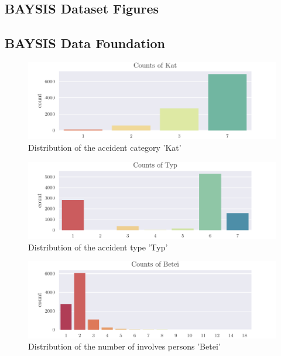 \documentclass[a4paper,headsepline,footsepline,fontsize=11pt,BCOR=12mm,DIV=12]{report}
\newcommand{\nocontentsline}[3]{}
\newcommand{\tocless}[2]{\bgroup\let\addcontentsline=\nocontentsline#1{#2}\egroup}
\begin{document}
\begin{appendices}


\chapter{BAYSIS Dataset Figures}
\label{appendix_baysis}

\tocless\section{BAYSIS Data Foundation}
\label{appendix_baysis_dataset}

\begin{figure}[h]
	\centering
	\includegraphics[scale=1]{../CorrAnalysis/data/BAYSIS/01_dataset/plots/baysis_dataset_count_Kat}
	\caption{Distribution of the accident category 'Kat'}
	\label{img:appendix_baysis_dataset_Kat}
\end{figure}

\begin{figure}[h]
	\centering
	\includegraphics[scale=1]{../CorrAnalysis/data/BAYSIS/01_dataset/plots/baysis_dataset_count_Typ}
	\caption{Distribution of the accident type 'Typ'}
	\label{img:appendix_baysis_dataset_Typ}
\end{figure}

\begin{figure}[h]
	\centering
	\includegraphics[scale=1]{../CorrAnalysis/data/BAYSIS/01_dataset/plots/baysis_dataset_count_Betei}
	\caption{Distribution of the number of involves persons 'Betei'}
	\label{img:appendix_baysis_dataset_Beteil}
\end{figure}


\end{appendices}
\end{document}
